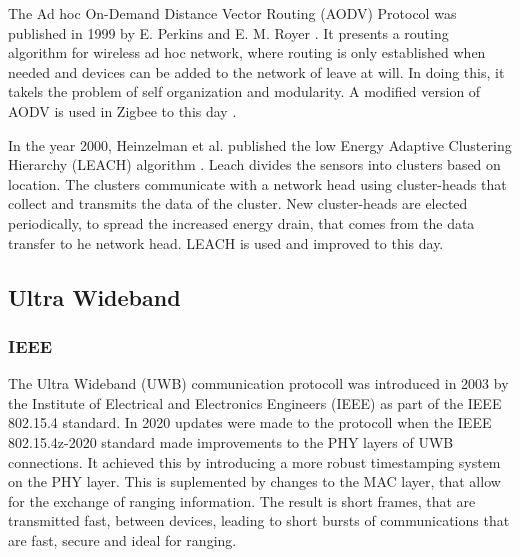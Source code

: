 The Ad hoc On-Demand Distance Vector Routing (AODV) Protocol was published in 1999 by E. Perkins and E. M. Royer \cite{royer1999multicast}.
It presents a routing algorithm for wireless ad hoc network, where routing is only established when needed and devices can be added to the network of leave at will.
In doing this, it takels the problem of self organization and modularity.
A modified version of AODV is used in Zigbee to this day \cite{mu2017improved}. 

In the year 2000, Heinzelman et al. published the low Energy Adaptive Clustering Hierarchy (LEACH) algorithm \cite{heinzelman2000energy}.
Leach divides the sensors into clusters based on location.
The clusters communicate with a network head using cluster-heads that collect and transmits the data of the cluster.
New cluster-heads are elected periodically, to spread the increased energy drain, that comes from the data transfer to he network head.
LEACH is used \cite{sefati2022cluster, ghazy2023low} and improved \cite{bagherzadeh2022survey} to this day.

\subsection{Ultra Wideband}

\subsubsection{IEEE}

The Ultra Wideband (UWB) communication protocoll was introduced in 2003 by the Institute of Electrical and Electronics Engineers (IEEE) as part of the IEEE 802.15.4 standard.
In 2020 updates were made to the protocoll when the IEEE 802.15.4z-2020 standard made improvements to the PHY layers of UWB connections. %
It achieved this by introducing a more robust timestamping system on the PHY layer.
This is suplemented by changes to the MAC layer, that allow for the exchange of ranging information.
The result is short frames, that are transmitted fast, between devices, leading to short bursts of communications that are fast, secure and ideal for ranging.


